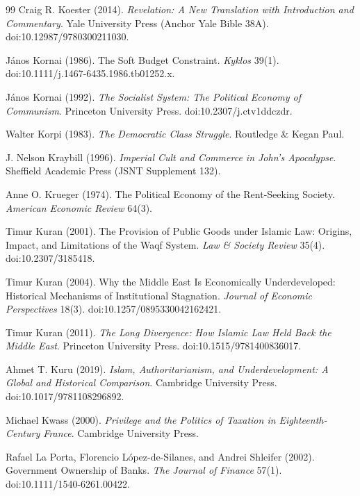 \documentclass[11pt,letterpaper]{article}
\theoremstyle{definition}
\theoremstyle{remark}
\begin{document}
\begin{thebibliography}{99}
Craig R. Koester (2014). \emph{Revelation: A New Translation with Introduction and Commentary}. Yale University Press (Anchor Yale Bible 38A). doi:10.12987/9780300211030.

J\'anos Kornai (1986). The Soft Budget Constraint. \emph{Kyklos} 39(1). doi:10.1111/j.1467-6435.1986.tb01252.x.

J\'anos Kornai (1992). \emph{The Socialist System: The Political Economy of Communism}. Princeton University Press. doi:10.2307/j.ctv1ddczdr.

Walter Korpi (1983). \emph{The Democratic Class Struggle}. Routledge \& Kegan Paul.

J. Nelson Kraybill (1996). \emph{Imperial Cult and Commerce in John's Apocalypse}. Sheffield Academic Press (JSNT Supplement 132).

Anne O. Krueger (1974). The Political Economy of the Rent-Seeking Society. \emph{American Economic Review} 64(3).

Timur Kuran (2001). The Provision of Public Goods under Islamic Law: Origins, Impact, and Limitations of the Waqf System. \emph{Law \& Society Review} 35(4). doi:10.2307/3185418.

Timur Kuran (2004). Why the Middle East Is Economically Underdeveloped: Historical Mechanisms of Institutional Stagnation. \emph{Journal of Economic Perspectives} 18(3). doi:10.1257/0895330042162421.

Timur Kuran (2011). \emph{The Long Divergence: How Islamic Law Held Back the Middle East}. Princeton University Press. doi:10.1515/9781400836017.

Ahmet T. Kuru (2019). \emph{Islam, Authoritarianism, and Underdevelopment: A Global and Historical Comparison}. Cambridge University Press. doi:10.1017/9781108296892.

Michael Kwass (2000). \emph{Privilege and the Politics of Taxation in Eighteenth-Century France}. Cambridge University Press.

Rafael La Porta, Florencio L\'opez-de-Silanes, and Andrei Shleifer (2002). Government Ownership of Banks. \emph{The Journal of Finance} 57(1). doi:10.1111/1540-6261.00422.


\end{thebibliography}
\end{document}
